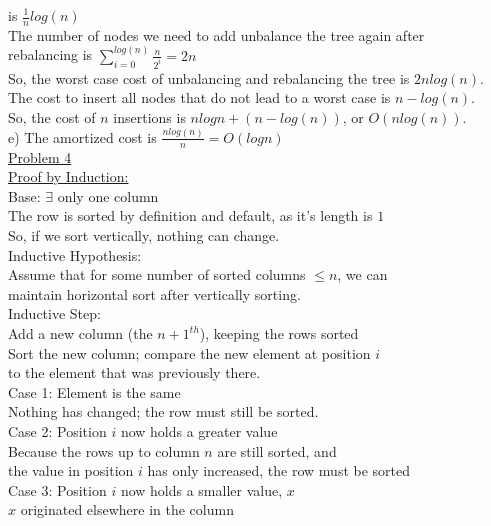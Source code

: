 \documentclass[12pt]{article}
\begin{document}
\indent\indent is $\frac{1}{n}log(n)$\\
\indent The number of nodes we need to add unbalance the tree again after\\
\indent \indent rebalancing is $\sum_{i=0}^{log(n)} \frac{n}{2^i} = 2n$\\
\indent So, the worst case cost of unbalancing and rebalancing the tree is $2nlog(n)$.\\
\indent The cost to insert all nodes that do not lead to a worst case is $n-log(n)$.\\
\indent So, the cost of $n$ insertions is $nlogn + (n  - log(n))$, or $O(nlog(n))$.\\
e) The amortized cost is $\frac{nlog(n)}{n} = O(logn)$\\
\underline{Problem 4}\\
\underline{Proof by Induction:}\\
Base: $\exists$ only one column\\
\indent The row is sorted by definition and default, as it's length is $1$\\
\indent So, if we sort vertically, nothing can change.\\
Inductive Hypothesis: \\
\indent Assume that for some number of sorted columns $\leq n$, we can\\
\indent\indent maintain horizontal sort after vertically sorting.\\
Inductive Step:\\
\indent Add a new column (the $n+1^{th}$), keeping the rows sorted\\
\indent Sort the new column; compare the new element at position $i$\\
\indent\indent to the element that was previously there.\\
\indent Case 1: Element is the same\\
\indent\indent Nothing has changed; the row must still be sorted.\\
\indent Case 2: Position $i$ now holds a greater value\\
\indent\indent Because the rows up to column $n$ are still sorted, and\\ 
\indent\indent\indent the value in position $i$ has only increased, the row must be sorted\\
\indent Case 3: Position $i$ now holds a smaller value, $x$\\
\indent\indent $x$ originated elsewhere in the column\\
\end{document}
